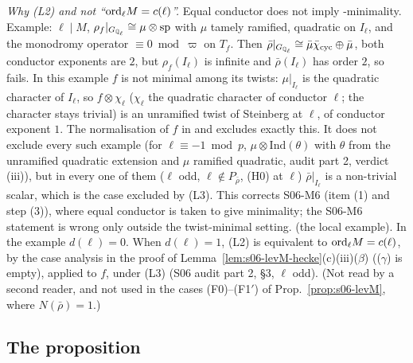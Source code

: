 \noindent\emph{Why (L2) and not ``$\mathrm{ord}_\ell M=c(\ell)$''.} Equal conductor does not imply \cite{KO}-minimality. Example: $\ell\mid M$,
$\rho_f|_{G_{\mathbb{Q}_\ell}}\cong\mu\otimes\mathrm{sp}$ with $\mu$ tamely ramified, quadratic on $I_\ell$, and the monodromy operator
$\equiv0\bmod\varpi$ on $T_f$. Then $\bar\rho|_{G_{\mathbb{Q}_\ell}}\cong\bar\mu\bar\chi_{\rm cyc}\oplus\bar\mu$, both conductor exponents are $2$, but
$\rho_f(I_\ell)$ is infinite and $\bar\rho(I_\ell)$ has order $2$, so \cite[Def.~3.5(1)]{KO} fails. In this example $f$ is not minimal among
its twists: $\mu|_{I_\ell}$ is the quadratic character of $I_\ell$, so $f\otimes\chi_\ell$ ($\chi_\ell$ the quadratic character of conductor $\ell$; the
character stays trivial) is an unramified twist of Steinberg at $\ell$, of conductor exponent $1$. The normalisation of $f$ in \cite[Rem.~2.2, p.~3]{KO}
and \cite[\S1.7.1]{DFG} excludes exactly this. It does not exclude every such example (for $\ell\equiv-1\bmod p$, $\mu\otimes\mathrm{Ind}(\theta)$
with $\theta$ from the unramified quadratic extension and $\mu$ ramified quadratic, audit part 2, verdict (iii)), but in every one of them
($\ell$ odd, $\ell\notin P_{\bar\rho}$, (H0) at $\ell$) $\bar\rho|_{I_\ell}$ is a non-trivial scalar, which is the case excluded by (L3). This corrects S06-M6 (item (1) and step (3)), where equal
conductor is taken to give minimality; the S06-M6 statement is wrong only outside the twist-minimal setting. \stproved{} (the
local example).  In the example $d(\ell)=0$. When $d(\ell)=1$, (L2) is equivalent to
$\mathrm{ord}_\ell M=c(\ell)$, by the case analysis in the proof of Lemma~\ref{lem:s06-levM-hecke}(c)(iii)($\beta$) (($\gamma$) is empty), applied to $f$, under (L3) (S06 audit part 2, \S3, $\ell$ odd). \stpmc{}
(Not read by a second reader, and not used in the cases (F0)--(F1$'$) of Prop.~\ref{prop:s06-levM}, where $N(\bar\rho)=1$.)

\subsection{The proposition}

